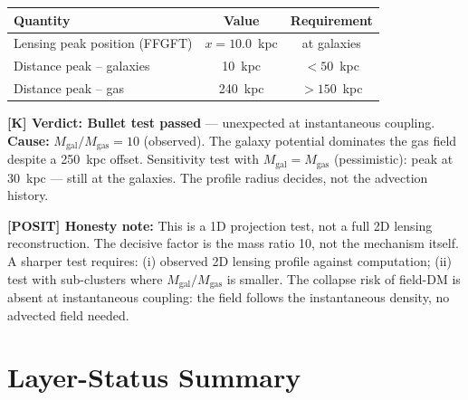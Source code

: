 \documentclass[11pt]{report}
\begin{document}
\begin{center}
\begin{tabular}{lcc}
\toprule
Quantity & Value & Requirement \\
\midrule
Lensing peak position (FFGFT) & $x = 10.0$~kpc & at galaxies \\
Distance peak -- galaxies & 10~kpc & $< 50$~kpc \\
Distance peak -- gas & 240~kpc & $> 150$~kpc \\
\bottomrule
\end{tabular}
\end{center}

\textbf{[K] Verdict: Bullet test passed} — unexpected at instantaneous
coupling. \textbf{Cause:} $M_\text{gal}/M_\text{gas} = 10$ (observed).
The galaxy potential dominates the gas field despite a 250~kpc offset.
Sensitivity test with $M_\text{gal} = M_\text{gas}$ (pessimistic):
peak at 30~kpc — still at the galaxies. The profile radius decides,
not the advection history.

\medskip
\textbf{[POSIT] Honesty note:} This is a 1D projection test, not a
full 2D lensing reconstruction. The decisive factor is the mass ratio 10,
not the mechanism itself. A sharper test requires: (i) observed 2D lensing
profile against computation; (ii) test with sub-clusters where
$M_\text{gal}/M_\text{gas}$ is smaller. The collapse risk of field-DM
is absent at instantaneous coupling: the field follows the instantaneous
density, no advected field needed.

\chapter{Layer-Status Summary}
\end{document}
